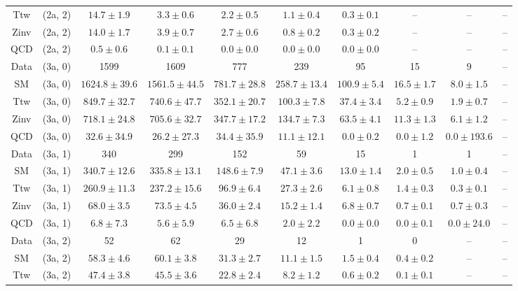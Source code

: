 \begin{table}[h!]
{\begin{tabular}{cccccccccc}
	Ttw & (2a, 2) & $14.7\pm 1.9$ & $3.3\pm 0.6$ & $2.2\pm 0.5$ & $1.1\pm 0.4$ & $0.3\pm 0.1$ & -- & -- & -- \\[0.5ex] 
	Zinv & (2a, 2) & $14.0\pm 1.7$ & $3.9\pm 0.7$ & $2.7\pm 0.6$ & $0.8\pm 0.2$ & $0.3\pm 0.2$ & -- & -- & -- \\[0.5ex] 
	QCD & (2a, 2) & $0.5\pm 0.6$ & $0.1\pm 0.1$ & $0.0\pm 0.0$ & $0.0\pm 0.0$ & $0.0\pm 0.0$ & -- & -- & -- \\[0.5ex] 
	Data & (3a, 0) & 1599 & 1609 & 777 & 239 & 95 & 15 & 9 & -- \\[0.5ex] 
	SM & (3a, 0) & $1624.8\pm 39.6$ & $1561.5\pm 44.5$ & $781.7\pm 28.8$ & $258.7\pm 13.4$ & $100.9\pm 5.4$ & $16.5\pm 1.7$ & $8.0\pm 1.5$ & -- \\[0.5ex] 
	Ttw & (3a, 0) & $849.7\pm 32.7$ & $740.6\pm 47.7$ & $352.1\pm 20.7$ & $100.3\pm 7.8$ & $37.4\pm 3.4$ & $5.2\pm 0.9$ & $1.9\pm 0.7$ & -- \\[0.5ex] 
	Zinv & (3a, 0) & $718.1\pm 24.8$ & $705.6\pm 32.7$ & $347.7\pm 17.2$ & $134.7\pm 7.3$ & $63.5\pm 4.1$ & $11.3\pm 1.3$ & $6.1\pm 1.2$ & -- \\[0.5ex] 
	QCD & (3a, 0) & $32.6\pm 34.9$ & $26.2\pm 27.3$ & $34.4\pm 35.9$ & $11.1\pm 12.1$ & $0.0\pm 0.2$ & $0.0\pm 1.2$ & $0.0\pm 193.6$ & -- \\[0.5ex] 
	Data & (3a, 1) & 340 & 299 & 152 & 59 & 15 & 1 & 1 & -- \\[0.5ex] 
	SM & (3a, 1) & $340.7\pm 12.6$ & $335.8\pm 13.1$ & $148.6\pm 7.9$ & $47.1\pm 3.6$ & $13.0\pm 1.4$ & $2.0\pm 0.5$ & $1.0\pm 0.4$ & -- \\[0.5ex] 
	Ttw & (3a, 1) & $260.9\pm 11.3$ & $237.2\pm 15.6$ & $96.9\pm 6.4$ & $27.3\pm 2.6$ & $6.1\pm 0.8$ & $1.4\pm 0.3$ & $0.3\pm 0.1$ & -- \\[0.5ex] 
	Zinv & (3a, 1) & $68.0\pm 3.5$ & $73.5\pm 4.5$ & $36.0\pm 2.4$ & $15.2\pm 1.4$ & $6.8\pm 0.7$ & $0.7\pm 0.1$ & $0.7\pm 0.3$ & -- \\[0.5ex] 
	QCD & (3a, 1) & $6.8\pm 7.3$ & $5.6\pm 5.9$ & $6.5\pm 6.8$ & $2.0\pm 2.2$ & $0.0\pm 0.0$ & $0.0\pm 0.1$ & $0.0\pm 24.0$ & -- \\[0.5ex] 
	Data & (3a, 2) & 52 & 62 & 29 & 12 & 1 & 0 & -- & -- \\[0.5ex] 
	SM & (3a, 2) & $58.3\pm 4.6$ & $60.1\pm 3.8$ & $31.3\pm 2.7$ & $11.1\pm 1.5$ & $1.5\pm 0.4$ & $0.4\pm 0.2$ & -- & -- \\[0.5ex] 
	Ttw & (3a, 2) & $47.4\pm 3.8$ & $45.5\pm 3.6$ & $22.8\pm 2.4$ & $8.2\pm 1.2$ & $0.6\pm 0.2$ & $0.1\pm 0.1$ & -- & -- \\[0.5ex] 

\end{tabular}}
\end{table}
